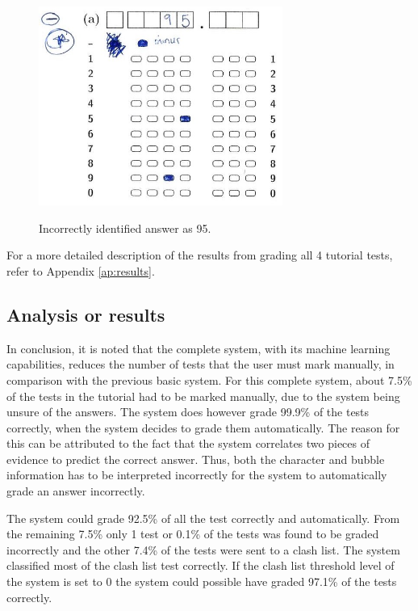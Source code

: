 \begin{figure}
  \centering
  \includegraphics[width=8cm]{wrongResult}\\
  \caption{Incorrectly identified answer as 95.}
  \label{fig:wrongAns}
\end{figure}

For a more detailed description of the results from grading all 4 tutorial tests, refer to Appendix \ref{ap:results}.

\subsection{Analysis or results}

In conclusion, it is noted that the complete system, with its machine learning capabilities, reduces the number of tests that the user must mark manually, in comparison with the previous basic system. For this complete system, about 7.5\% of the tests in the tutorial had to be marked manually, due to the system being unsure of the answers. The system does however grade 99.9\% of the tests correctly, when the system decides to grade them automatically. The reason for this can be attributed to the fact that the system correlates two pieces of evidence to predict the correct answer. Thus, both the character and bubble information has to be interpreted incorrectly for the system to automatically grade an answer incorrectly. 

The system could grade 92.5\% of all the test correctly and automatically. From the remaining 7.5\% only 1 test or 0.1\% of the tests was found to be graded incorrectly and the other 7.4\% of the tests were sent to a clash list. The system classified most of the clash list test correctly. If the clash list threshold level of the system is set to 0 the system could possible have graded 97.1\% of the tests correctly.

